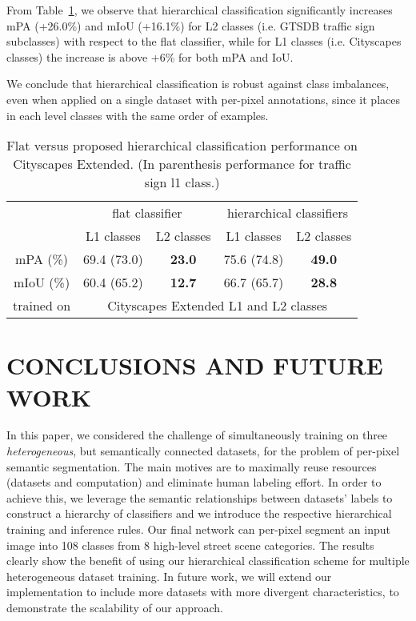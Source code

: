 \documentclass[letterpaper, 10 pt, conference]{ieeeconf}
\begin{document}
From Table~\ref{tab:flat-vs-hierarchical}, we observe that hierarchical classification significantly increases mPA (+26.0\%) and
mIoU (+16.1\%) for L2 classes (i.e. GTSDB traffic sign subclasses) with respect to the flat classifier, while for L1 classes (i.e. Cityscapes classes) the increase is above +6\% for both mPA and IoU.

We conclude that hierarchical classification is robust against class imbalances, even when applied on a single dataset with per-pixel annotations, since it places in each level classes with the same order of examples.

\begin{table}
\centering
	\caption{Flat versus proposed hierarchical classification performance on Cityscapes Extended. (In parenthesis performance for traffic sign l1 class.)}
\begin{tabular}{c||c|c||c|c}
		& \multicolumn{2}{c||}{flat classifier} & \multicolumn{2}{c}{hierarchical classifiers}\\
& L1 classes & L2 classes & L1 classes & L2 classes\\
		\hline
		mPA (\%) & 69.4 (73.0) & \textbf{23.0} & 75.6 (74.8) & \textbf{49.0}\\
		mIoU (\%) & 60.4 (65.2) & \textbf{12.7} & 66.7 (65.7) & \textbf{28.8}\\
		\hline
		trained on & \multicolumn{4}{c}{Cityscapes Extended L1 and L2 classes}
	\end{tabular}
	\label{tab:flat-vs-hierarchical}
\end{table}

\section{CONCLUSIONS AND FUTURE WORK}
In this paper, we considered the challenge of simultaneously training on three \textit{heterogeneous}, but semantically connected datasets, for the problem of per-pixel semantic segmentation. The main motives are to maximally reuse resources (datasets and computation) and eliminate human labeling effort. In order to achieve this, we leverage the semantic relationships between datasets' labels to construct a hierarchy of classifiers and we introduce the respective hierarchical training and inference rules. Our final network can per-pixel segment an input image into 108 classes from 8 high-level street scene categories. The results clearly show the benefit of using our hierarchical classification scheme for multiple heterogeneous dataset training. In future work, we will extend our implementation to include more datasets with more divergent characteristics, to demonstrate the scalability of our approach.






\end{document}
